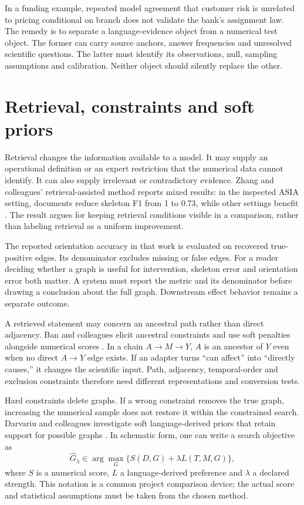 In a funding example, repeated model agreement that customer risk is unrelated
to pricing conditional on branch does not validate the bank's assignment law.
The remedy is to separate a language-evidence object from a numerical test
object. The former can carry source anchors, answer frequencies and unresolved
scientific questions. The latter must identify its observations, null,
sampling assumptions and calibration. Neither object should silently replace
the other.

\section{Retrieval, constraints and soft priors}

Retrieval changes the information available to a model. It may supply an
operational definition or an expert restriction that the numerical data cannot
identify. It can also supply irrelevant or contradictory evidence. Zhang and
colleagues' retrieval-assisted method reports mixed results: in the inspected
ASIA setting, documents reduce skeleton F1 from 1 to 0.73, while other settings
benefit \citep{v12_la_2402_15301}. The result argues for keeping retrieval
conditions visible in a comparison, rather than labeling retrieval as a
uniform improvement.

The reported orientation accuracy in that work is evaluated on recovered
true-positive edges. Its denominator excludes missing or false edges. For a
reader deciding whether a graph is useful for intervention, skeleton error and
orientation error both matter. A system must report the metric and its
denominator before drawing a conclusion about the full graph. Downstream
effect behavior remains a separate outcome.

A retrieved statement may concern an ancestral path rather than direct
adjacency. Ban and colleagues elicit ancestral constraints and use soft
penalties alongside numerical scores \citep{v12_la_2306_16902}. In a chain
$A\to M\to Y$, $A$ is an ancestor of $Y$ even when no direct $A\to Y$
edge exists. If an adapter turns ``can affect'' into ``directly causes,'' it
changes the scientific input. Path, adjacency, temporal-order and exclusion
constraints therefore need different representations and conversion tests.

Hard constraints delete graphs. If a wrong constraint removes the true graph,
increasing the numerical sample does not restore it within the constrained
search. Darvariu and colleagues investigate soft language-derived priors that
retain support for possible graphs \citep{v12_la_2405_13551}. In schematic
form, one can write a search objective as
\begin{equation}
 \widehat G_\lambda\in\arg\max_G
 \{S(D,G)+\lambda L(T,M,G)\},
 \label{eq:la03-soft-score}
\end{equation}
where $S$ is a numerical score, $L$ a language-derived preference and
$\lambda$ a declared strength. This notation is a common project comparison
device; the actual score and statistical assumptions must be taken from the
chosen method.

